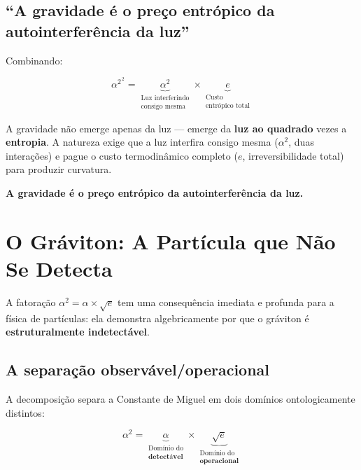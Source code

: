 \documentclass[12pt,a4paper,twoside]{article}
\newcommand{\alphaii}{\alpha^{2}}
\begin{document}
\subsection{``A gravidade é o preço entrópico da autointerferência da luz''}

Combinando:

\begin{conclusionbox}[title={Síntese Quadrática}]
\begin{equation}
\alphaii^{\,2} = \underbrace{\alpha^2}_{\substack{\text{Luz interferindo}\\\text{consigo mesma}}} \times \underbrace{e}_{\substack{\text{Custo}\\\text{entrópico total}}}
\end{equation}

A gravidade não emerge apenas da luz --- emerge da \textbf{luz ao quadrado} vezes a \textbf{entropia}. A natureza exige que a luz interfira consigo mesma ($\alpha^2$, duas interações) e pague o custo termodinâmico completo ($e$, irreversibilidade total) para produzir curvatura.

\medskip
\textbf{A gravidade é o preço entrópico da autointerferência da luz.}
\end{conclusionbox}



\section{O Gráviton: A Partícula que Não Se Detecta}
\label{sec:graviton}

A fatoração $\alphaii = \alpha \times \sqrt{e}$ tem uma consequência imediata e profunda para a física de partículas: ela demonstra algebricamente por que o gráviton é \textbf{estruturalmente indetectável}.

\subsection{A separação observável/operacional}

A decomposição separa a Constante de Miguel em dois domínios ontologicamente distintos:

\begin{factorbox}[title={Dois domínios}]
\begin{equation}
\alphaii = \underbrace{\alpha}_{\substack{\text{Domínio do}\\\textbf{detectável}}} \times \underbrace{\sqrt{e}}_{\substack{\text{Domínio do}\\\textbf{operacional}}}
\end{equation}
\end{factorbox}
\end{document}
